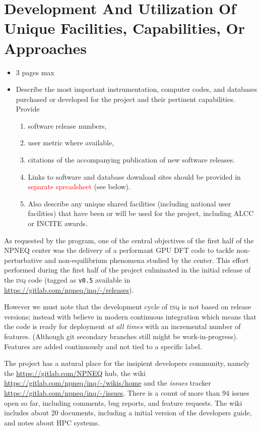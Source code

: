 \section{Development And Utilization Of Unique Facilities, Capabilities, Or Approaches}
\label{sec:development}
{\small\color{red}
\begin{itemize}
\item 3 pages max
    \item Describe the most important instrumentation, computer codes, and databases purchased or developed for the project and their pertinent capabilities. Provide 
    \begin{enumerate}
        \item software release numbers,
        \item user metric where available,
        
        \item citations of the accompanying publication of new software releases.
        \item Links to software and database download sites should be provided in  \textcolor{red}{separate spreadsheet} (see below).
        \item Also describe any unique shared facilities (including national user facilities) that have been or will be used for the project, including ALCC or INCITE awards.
    \end{enumerate}    
\end{itemize}

}

As requested by the program, one of the central objectives of the first half of the NPNEQ center was the delivery of a performant GPU DFT code to tackle non-perturbative and non-equilibrium phenomena studied by the center.
This effort performed during the first half of the project culminated in the initial release of the \textsc{inq} code (tagged as \texttt{v0.5} available in \url{https://gitlab.com/npneq/inq/-/releases}).

However we must note that the development cycle of \textsc{inq} is not based on release versions; instead with believe in modern continuous integration which means that the code is ready for deployment \emph{at all times} with an incremental number of features.
(Although git secondary branches still might be work-in-progress).
Features are added continuously and not tied to a specific label.

The project has a natural place for the insipient developers community, namely the \url{https://gitlab.com/NPNEQ} hub, the wiki \url{https://gitlab.com/npneq/inq/-/wikis/home} and the \emph{issues} tracker \url{https://gitlab.com/npneq/inq/-/issues}.
There is a count of more than 94 issues open so far, including comments, bug reports, and feature requests.
The wiki includes about 20 documents, including a initial version of the developers guide, and notes about HPC systems.

